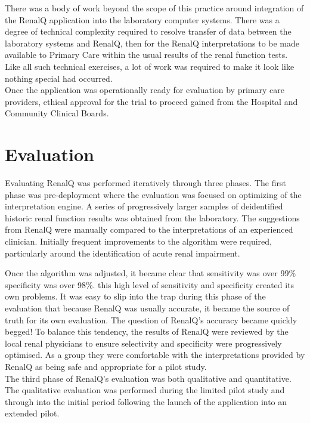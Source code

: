 \documentclass[11pt]{article}
\begin{document}
There was a body of work beyond the scope of this practice around integration of the RenalQ application into the laboratory computer systems. There was a degree of technical complexity required to resolve transfer of data between the laboratory systems and RenalQ, then for the RenalQ interpretations to be made available to Primary Care within the usual results of the renal function tests. Like all such technical exercises, a lot of work was required to make it look like nothing special had occurred. \\

Once the application was operationally ready for evaluation by primary care providers, ethical approval for the trial to proceed gained from the Hospital and Community Clinical Boards. \\

\section{Evaluation}

Evaluating RenalQ was performed iteratively through three phases. The first phase was pre-deployment where the evaluation was focused on optimizing of the interpretation engine. A series of progressively larger samples of deidentified historic renal function results was obtained from the laboratory. The suggestions from RenalQ were manually compared to the interpretations of an experienced clinician. Initially frequent improvements to the algorithm were required, particularly around the identification of acute renal impairment. 

Once the algorithm was adjusted, it became clear that sensitivity was over 99\% specificity was over 98\%. this high level of sensitivity and specificity created its own problems. It was easy to slip into the trap during this phase of the evaluation that because RenalQ was usually accurate, it became the source of truth for its own evaluation. The question of RenalQ's accuracy became quickly begged! To balance this tendency, the results of RenalQ were reviewed by the local renal physicians to ensure selectivity and specificity were progressively optimised. As a group they were comfortable with the interpretations provided by RenalQ as being safe and appropriate for a pilot study. \\ 

The third phase of RenalQ's evaluation was both qualitative and quantitative. The qualitative evaluation was performed during the limited pilot study and through into the initial period following the launch of the application into an extended pilot. 
\end{document}
